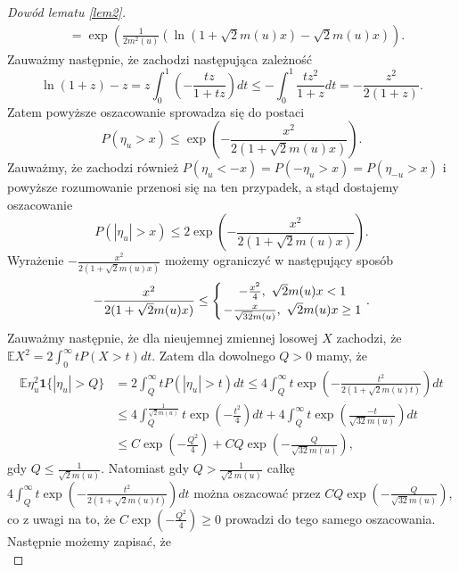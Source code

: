 \documentclass[man,mfiu]{mgrwms}
\begin{document}
\begin{proof}[Dowód lematu \ref{lem2}]
\begin{displaymath}
\begin{split}
&=\exp\left(\frac{1}{2m^2(u)}\left(\ln \left(1+\sqrt{2}m(u)x\right)-\sqrt{2}m(u)x\right)\right).
\end{split}
\end{displaymath}
Zauważmy następnie, że zachodzi następująca zależność
\begin{displaymath}
\ln(1+z)-z=z\int_0^1\left(-\frac{tz}{1+tz}\right)dt\leq -\int_0^1\frac{tz^2}{1+z}dt=-\frac{z^2}{2(1+z)}.
\end{displaymath}Zatem powyższe oszacowanie sprowadza się do postaci 
\begin{displaymath}
P(\eta_u>x)\leq \exp\left(-\frac{x^2}{2(1+\sqrt{2}m(u)x)}\right).
\end{displaymath}
Zauważmy, że zachodzi również $P(\eta_u <-x)=P(-\eta_u>x)=P(\eta_{-u}>x)$ i powyższe rozumowanie przenosi się na ten przypadek, a stąd dostajemy oszacowanie 
\begin{displaymath}
P(|\eta_u|>x)\leq 2\exp\left(-\frac{x^2}{2(1+\sqrt{2}m(u)x)}\right).
\end{displaymath}
Wyrażenie $-\frac{x^2}{2(1+\sqrt{2}m(u)x)}$ możemy ograniczyć w następujący sposób
\begin{displaymath}
-\frac{x^2}{2(1+\sqrt{2}m(u)x)}\leq \left\{{-\frac{x^2}{4},\ \sqrt{2}m(u)x<1}\atop{-\frac{x}{\sqrt{32}m(u)},\ \sqrt{2}m(u)x\geq  1}\right. .
\end{displaymath}
Zauważmy następnie, że dla nieujemnej zmiennej losowej $X$ zachodzi, że $\mathbb{E}X^2=2\int_0^{\infty}tP(X>t)dt$. Zatem dla dowolnego $ Q>0$ mamy, że
\begin{displaymath}
\begin{split}
\mathbb{E}\eta_u^2\pmb{1}\{|\eta_u|>Q\}&=2\int_Q^{\infty}tP(|\eta_u|>t)dt\leq 4\int_Q^{\infty}t\exp\left(-\frac{t^2}{2(1+\sqrt{2}m(u)t)}\right)dt\\
&\leq 4\int_Q^{\frac{1}{\sqrt{2}m(u)}}t\exp\left(-\frac{t^2}{4}\right)dt+4\int_Q^{\infty}t\exp \left(\frac{-t}{\sqrt{32}m(u)}\right)dt\\
&\leq C\exp\left(-\frac{Q^2}{4}\right)+CQ\exp\left(-\frac{Q}{\sqrt{32}m(u)}\right),
\end{split}
\end{displaymath}
gdy $Q\leq \frac{1}{\sqrt{2}m(u)}$. Natomiast gdy $Q>\frac{1}{\sqrt{2}m(u)}$ całkę $4\int_Q^{\infty}t\exp\left(-\frac{t^2}{2(1+\sqrt{2}m(u)t)}\right)dt$ można oszacować przez $CQ\exp\left(-\frac{Q}{\sqrt{32}m(u)}\right)$, co z uwagi na to, że $C\exp\left(-\frac{Q^2}{4}\right)\geq 0$ prowadzi do tego samego oszacowania.
Następnie możemy zapisać, że
\begin{displaymath}

\end{displaymath}
\end{proof}
\end{document}

